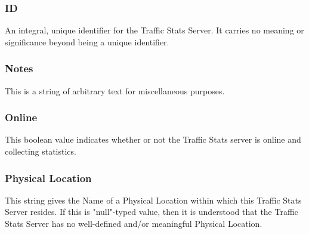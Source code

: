 \subsubsection{ID}
An integral, unique identifier for the Traffic Stats Server. It carries no
meaning or significance beyond being a unique identifier.

\subsubsection{Notes}
This is a string of arbitrary text for miscellaneous purposes.

\subsubsection{Online}
This boolean value indicates whether or not the Traffic Stats server is online
and collecting statistics.

\subsubsection{Physical Location}
This string gives the Name of a Physical Location within which this Traffic
Stats Server resides. If this is "null"-typed value, then it is understood that
the Traffic Stats Server has no well-defined and/or meaningful Physical
Location.
